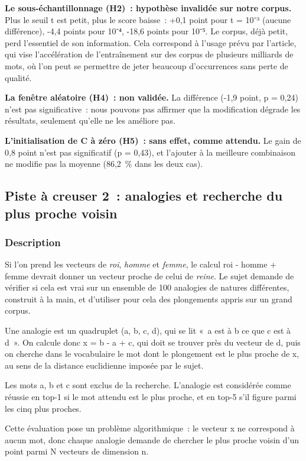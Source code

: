 \documentclass[11pt,a4paper]{article}
\begin{document}
\textbf{Le sous-échantillonnage (H2)~: hypothèse invalidée sur notre corpus.} Plus le seuil t est petit, plus le score baisse~: +0,1 point pour t = 10⁻³ (aucune différence), -4,4 points pour 10⁻⁴, -18,6 points pour 10⁻⁵. Le corpus, déjà petit, perd l’essentiel de son information. Cela correspond à l’usage prévu par l’article, qui vise l’accélération de l’entraînement sur des corpus de plusieurs milliards de mots, où l’on peut se permettre de jeter beaucoup d’occurrences sans perte de qualité.

\textbf{La fenêtre aléatoire (H4)~: non validée.} La différence (-1,9 point, p = 0,24) n’est pas significative~: nous pouvons pas affirmer que la modification dégrade les résultats, seulement qu’elle ne les améliore pas.

\textbf{L’initialisation de C à zéro (H5)~: sans effet, comme attendu.} Le gain de 0,8 point n’est pas significatif (p = 0,43), et l’ajouter à la meilleure combinaison ne modifie pas la moyenne (86,2~\% dans les deux cas).

\subsection{Piste à creuser 2~: analogies et recherche du plus proche voisin}

\subsubsection{Description}

Si l’on prend les vecteurs de \emph{roi}, \emph{homme} et \emph{femme}, le calcul roi - homme + femme devrait donner un vecteur proche de celui de \emph{reine}. Le sujet demande de vérifier si cela est vrai sur un ensemble de 100 analogies de natures différentes, construit à la main, et d’utiliser pour cela des plongements appris sur un grand corpus.

Une analogie est un quadruplet (a, b, c, d), qui se lit «~a est à b ce que c est à d~». On calcule donc x = b - a + c, qui doit se trouver près du vecteur de d, puis on cherche dans le vocabulaire le mot dont le plongement est le plus proche de x, au sens de la distance euclidienne imposée par le sujet.

Les mots a, b et c sont exclus de la recherche. L’analogie est considérée comme réussie en top-1 si le mot attendu est le plus proche, et en top-5 s’il figure parmi les cinq plus proches.

Cette évaluation pose un problème algorithmique~: le vecteur x ne correspond à aucun mot, donc chaque analogie demande de chercher le plus proche voisin d’un point parmi N vecteurs de dimension n.
\end{document}
